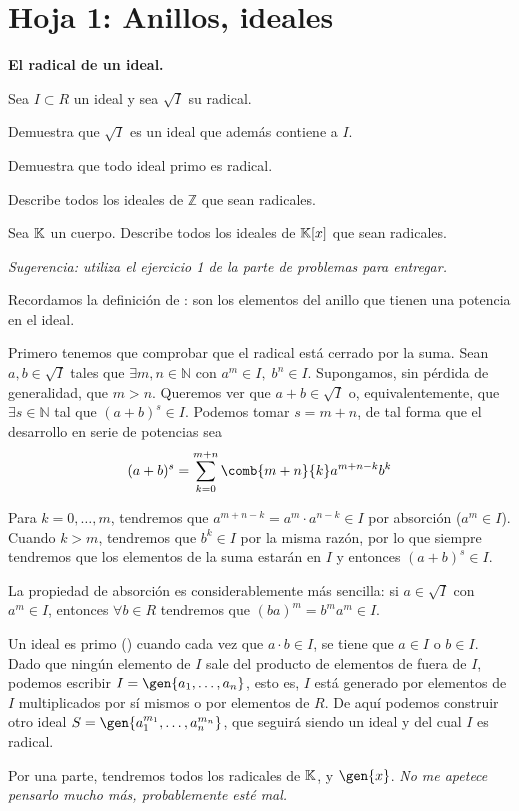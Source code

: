 \section{Hoja 1: Anillos, ideales}

\begin{problem}
{\bfseries El radical de un ideal.}

Sea $I\subset R$ un ideal  y sea $\sqrt{I}$ su radical.

\ppart Demuestra que $\sqrt{I}$ es un ideal que además contiene a $I$.

\ppart Demuestra que todo ideal primo es radical.

\ppart Describe todos los ideales de ${\mathbb Z}$ que sean radicales.

\ppart Sea $\mathbb{K}$ un cuerpo. Describe todos los ideales de $\mathbb{K}[x]$ que sean radicales.

{\em Sugerencia: utiliza el ejercicio 1  de la parte de problemas para entregar.}

\solution


Recordamos la definición de : son los elementos del anillo que tienen una potencia en el ideal.

\spart

Primero tenemos que comprobar que el radical está cerrado por la suma. Sean $a,b ∈ \sqrt{I}$ tales que $∃m,n ∈ ℕ$ con $a^m ∈ I,\;b^n ∈ I$. Supongamos, sin pérdida de generalidad, que $m > n$. Queremos ver que $a+b ∈ \sqrt{I}$ o, equivalentemente, que $∃s ∈ ℕ$ tal que $(a+b)^s ∈ I$. Podemos tomar $s = m + n$, de tal forma que el desarrollo en serie de potencias sea \[ (a+b)^s = \sum_{k=0}^{m+n} \comb{m+n}{k} a^{m+n-k}b^k \]

Para $k = 0, \dotsc, m$, tendremos que $a^{m+n-k} = a^m·a^{n-k} ∈ I$ por absorción ($a^m ∈ I$). Cuando $k > m$, tendremos que $b^k ∈ I$ por la misma razón, por lo que siempre tendremos que los elementos de la suma estarán en $I$ y entonces $(a+b)^s ∈ I$.

La propiedad de absorción es considerablemente más sencilla: si $a∈\sqrt{I}$ con $a^m ∈ I$, entonces $∀b ∈ R$ tendremos que $(ba)^m = b^m a^m ∈ I$.

\spart

Un ideal es primo () cuando cada vez que $a · b ∈ I$, se tiene que $a ∈ I$ o $b ∈ I$. Dado que ningún elemento de $I$ sale del producto de elementos de fuera de $I$, podemos escribir $I = \gen{a_1, \dotsc, a_n}$, esto es, $I$ está generado por elementos de $I$ multiplicados por sí mismos o por elementos de $R$. De aquí podemos construir otro ideal $S = \gen{a_1^{m_1}, \dotsc, a_n^{m_n}}$, que seguirá siendo un ideal y del cual $I$ es radical. %

\spart


\spart

Por una parte, tendremos todos los radicales de $\mathbb{K}$, y $\gen{x}$. \textit{No me apetece pensarlo mucho más, probablemente esté mal.}

\end{problem}

